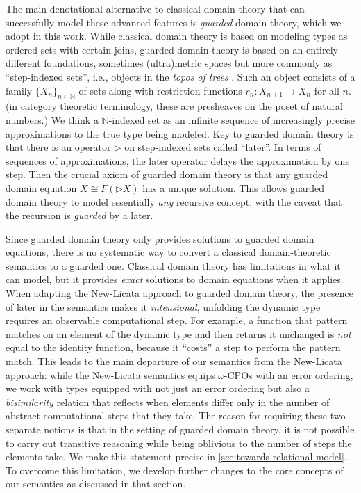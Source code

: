 The main denotational alternative to classical domain theory that can
successfully model these advanced features is \emph{guarded} domain
theory, which we adopt in this work. While classical domain theory is
based on modeling types as ordered sets with certain joins, guarded
domain theory is based on an entirely different foundations, sometimes
(ultra)metric spaces but more commonly as ``step-indexed sets'', i.e.,
objects in the \emph{topos of trees}
\cite{birkedal-mogelberg-schwinghammer-stovring2011}.  Such an object
consists of a family $\{X_n\}_{n \in \mathbb{N}}$ of sets along with
restriction functions $r_n : X_{n+1} \to X_n$ for all $n$.  (in
category theoretic terminology, these are presheaves on the poset of
natural numbers.)  We think a $\mathbb{N}$-indexed set as an infinite
sequence of increasingly precise approximations to the true type being
modeled.
%
Key to guarded domain theory is that there is an operator
$\triangleright$ on step-indexed sets called ``later''. In terms of
sequences of approximations, the later operator delays the
approximation by one step. Then the crucial axiom of guarded domain
theory is that any guarded domain equation $X \cong F(\triangleright
X)$ has a unique solution. This allows guarded domain theory to model
essentially \emph{any} recursive concept, with the caveat that the
recursion is \emph{guarded} by a later.

Since guarded domain theory only provides solutions to guarded domain
equations, there is no systematic way to convert a classical
domain-theoretic semantics to a guarded one.  Classical domain theory
has limitations in what it can model, but it provides \emph{exact}
solutions to domain equations when it applies. When adapting the
New-Licata approach to guarded domain theory, the presence of later in
the semantics makes it \emph{intensional}, unfolding the dynamic type
requires an observable computational step. For example, a function
that pattern matches on an element of the dynamic type and then
returns it unchanged is \emph{not} equal to the identity function,
because it ``costs'' a step to perform the pattern match.
%
This leads to the main departure of our semantics from the New-Licata
approach: while the New-Licata semantics equips $\omega$-CPOs with an
error ordering, we work with types equipped with not just an error
ordering but also a \emph{bisimilarity} relation that reflects when
elements differ only in the number of abstract computational steps
that they take.
%
The reason for requiring these two separate notions is that in the setting of
guarded domain theory, it is not possible to carry out transitive reasoning
while being oblivious to the number of steps the elements take. We make this
statement precise in \ref{sec:towards-relational-model}. To overcome this
limitation, we develop further changes to the core concepts of our semantics as
discussed in that section.

